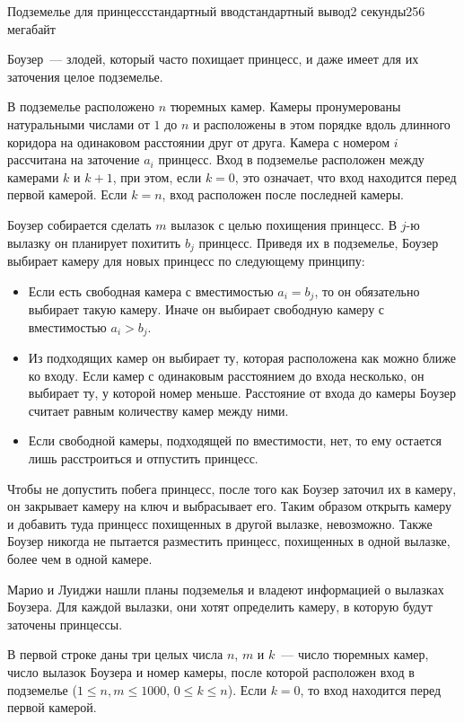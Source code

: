 \begin{problem}{Подземелье для принцесс}{стандартный ввод}{стандартный вывод}{2 секунды}{256 мегабайт}

Боузер~--- злодей, который часто похищает принцесс, и даже имеет для их заточения целое подземелье. 

В подземелье расположено $n$ тюремных камер. Камеры пронумерованы натуральными числами от $1$ до $n$ и расположены в этом порядке вдоль длинного коридора на одинаковом расстоянии друг от друга. Камера с номером $i$ рассчитана на заточение $a_i$ принцесс. Вход в подземелье расположен между камерами $k$ и $k + 1$, при этом, если $k = 0$, это означает, что вход находится перед первой камерой. Если $k = n$, вход расположен после последней камеры.

Боузер собирается сделать $m$ вылазок с целью похищения принцесс. В $j$-ю вылазку он планирует похитить $b_j$ принцесс. Приведя их в подземелье, 
Боузер выбирает камеру для новых принцесс по следующему принципу:
\begin{itemize}
\item Если есть свободная камера с вместимостью $a_i = b_j$, то он обязательно выбирает такую камеру. Иначе он выбирает свободную камеру с вместимостью $a_i > b_j$.
\item Из подходящих камер он выбирает ту, которая расположена как можно ближе ко входу. Если камер с одинаковым расстоянием до входа несколько, он выбирает ту, у которой номер меньше. Расстояние от входа до камеры Боузер считает равным количеству камер между ними.
\item Если свободной камеры, подходящей по вместимости, нет, то ему остается лишь расстроиться и отпустить принцесс.
\end{itemize}
Чтобы не допустить побега принцесс, после того как Боузер заточил их в камеру, он закрывает камеру на ключ и выбрасывает его. Таким образом открыть камеру и добавить туда принцесс похищенных в другой вылазке, невозможно. Также Боузер никогда не пытается разместить принцесс, похищенных в одной вылазке, более чем в одной камере.

Марио и Луиджи нашли планы подземелья и владеют информацией о вылазках Боузера. Для каждой вылазки, они хотят определить камеру, в которую будут заточены принцессы.

\InputFile
В первой строке даны три целых числа $n$, $m$ и $k$~--- число тюремных камер, число вылазок Боузера и номер камеры, после которой расположен вход в подземелье ($1 \le n, m \le 1000$, $0 \le k \le n$). Если $k = 0$, то вход находится перед первой камерой.


\end{problem}
